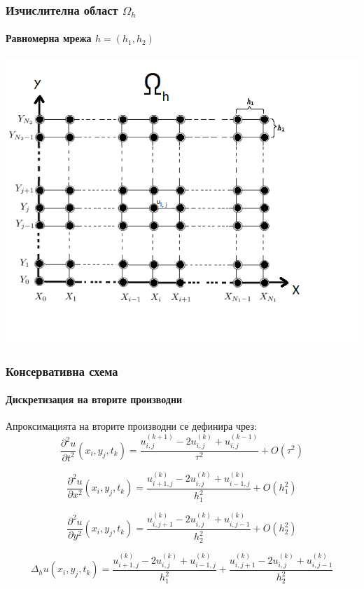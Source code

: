 \documentclass{beamer}
\begin{document}
\begin{frame}
\frametitle{Изчислителна област $\Omega_h$}
\framesubtitle{Равномерна мрежа $h=(h_1, h_2)$}
\begin{center}\vspace{0.4cm}
	\begin{minipage}[b]{0.6\linewidth}
		\includegraphics[width=\linewidth]{Omega_dah.png}
	\end{minipage}
\end{center}

\end{frame}


\begin{frame}
\frametitle{Консервативна схема}
\framesubtitle{Дискретизация на вторите производни}
Апроксимацията на вторите производни се дефинира чрез:
\begin{equation}
\frac{\partial^2 u}{\partial t^2}(x_i, y_j, t_k ) = \frac{ u^{(k+1)}_{i, j} - 2u^{(k)}_{i,j} + u^{(k-1)}_{i,j} }{\tau^2} + O(\tau^2) 
\end{equation}

\begin{equation}
\frac{\partial^2 u}{\partial x^2}(x_i, y_j, t_k ) = \frac{ u^{(k)}_{i+1, j} - 2u^{(k)}_{i,j} + u^{(k)}_{i-1,j} }{h_1^2} + O(h_1^2) 
\end{equation}

\begin{equation}
\frac{\partial^2 u}{\partial y^2}(x_i, y_j, t_k ) = \frac{ u^{(k)}_{i, j+1} - 2u^{(k)}_{i,j} + u^{(k)}_{i,j-1} }{h_2^2} + O(h_2^2) 
\end{equation}


\begin{equation}
\Delta_h u(x_i, y_j, t_k )  = \frac{ u^{(k)}_{i+1, j} - 2u^{(k)}_{i,j} + u^{(k)}_{i-1,j} }{h_1^2} + \frac{ u^{(k)}_{i, j+1} - 2u^{(k)}_{i,j} + u^{(k)}_{i,j-1} }{h_2^2}
\end{equation}

\end{frame}
\end{document}
